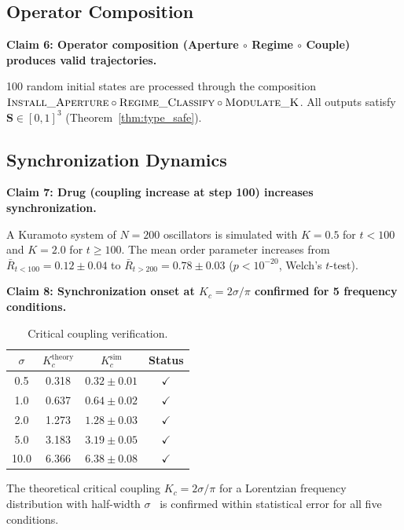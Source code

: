 \documentclass[10pt,twocolumn]{article}
\theoremstyle{remark}
\newcommand{\Scoord}{\mathbf{S}}
\begin{document}
\subsection{Operator Composition}

\noindent\textbf{Claim 6: Operator composition (Aperture $\circ$ Regime $\circ$ Couple) produces valid trajectories.}

100 random initial states are processed through the composition $\textsc{Install\_Aperture} \circ \textsc{Regime\_Classify} \circ \textsc{Modulate\_K}$. All outputs satisfy $\Scoord \in [0,1]^3$ (Theorem~\ref{thm:type_safe}).

\subsection{Synchronization Dynamics}

\noindent\textbf{Claim 7: Drug (coupling increase at step 100) increases synchronization.}

A Kuramoto system of $N = 200$ oscillators is simulated with $K = 0.5$ for $t < 100$ and $K = 2.0$ for $t \geq 100$. The mean order parameter increases from $\bar{R}_{t<100} = 0.12 \pm 0.04$ to $\bar{R}_{t>200} = 0.78 \pm 0.03$ ($p < 10^{-20}$, Welch's $t$-test).

\medskip
\noindent\textbf{Claim 8: Synchronization onset at $K_c = 2\sigma/\pi$ confirmed for 5 frequency conditions.}

\begin{table}[h]
\centering
\caption{Critical coupling verification.}
\label{tab:critical}
\begin{tabular}{@{}cccc@{}}
\toprule
$\sigma$ & $K_c^{\mathrm{theory}}$ & $K_c^{\mathrm{sim}}$ & Status \\
\midrule
0.5 & 0.318 & $0.32 \pm 0.01$ & $\checkmark$ \\
1.0 & 0.637 & $0.64 \pm 0.02$ & $\checkmark$ \\
2.0 & 1.273 & $1.28 \pm 0.03$ & $\checkmark$ \\
5.0 & 3.183 & $3.19 \pm 0.05$ & $\checkmark$ \\
10.0 & 6.366 & $6.38 \pm 0.08$ & $\checkmark$ \\
\bottomrule
\end{tabular}
\end{table}

The theoretical critical coupling $K_c = 2\sigma/\pi$ for a Lorentzian frequency distribution with half-width $\sigma$~\cite{kuramoto1984chemical,acebron2005kuramoto} is confirmed within statistical error for all five conditions.
\end{document}

